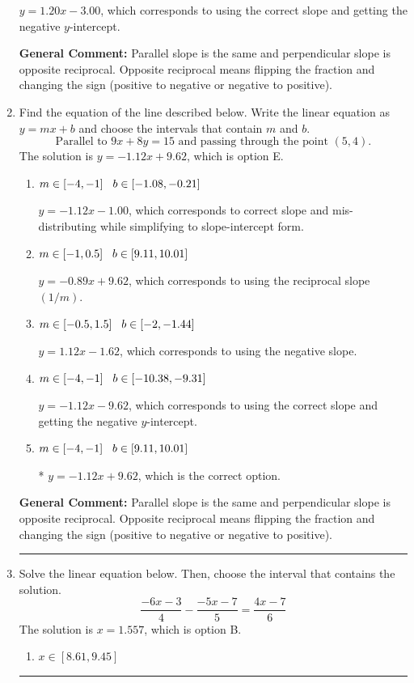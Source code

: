 \documentclass{extbook}[14pt]
\newcommand{\litem}[1]{\item #1

\rule{\textwidth}{0.4pt}}
\begin{document}
\begin{enumerate}
{\begin{enumerate}[label=\Alph*.]
 $y = 1.20x - 3.00$, which corresponds to using the correct slope and getting the negative $y$-intercept.
\end{enumerate}

\textbf{General Comment:} Parallel slope is the same and perpendicular slope is opposite reciprocal. Opposite reciprocal means flipping the fraction and changing the sign (positive to negative or negative to positive).
}
\litem{
Find the equation of the line described below. Write the linear equation as $ y=mx+b $ and choose the intervals that contain $m$ and $b$.
\[ \text{Parallel to } 9 x + 8 y = 15 \text{ and passing through the point } (5, 4). \]
The solution is \( y = -1.12x + 9.62 \), which is option E.\begin{enumerate}[label=\Alph*.]
\item \( m \in [-4, -1] \hspace*{3mm} b \in [-1.08, -0.21] \)

 $y = -1.12x - 1.00$, which corresponds to correct slope and mis-distributing while simplifying to slope-intercept form.
\item \( m \in [-1, 0.5] \hspace*{3mm} b \in [9.11, 10.01] \)

 $y = -0.89x + 9.62$, which corresponds to using the reciprocal slope $(1/m)$.
\item \( m \in [-0.5, 1.5] \hspace*{3mm} b \in [-2, -1.44] \)

 $y = 1.12x - 1.62$, which corresponds to using the negative slope.
\item \( m \in [-4, -1] \hspace*{3mm} b \in [-10.38, -9.31] \)

 $y = -1.12x - 9.62$, which corresponds to using the correct slope and getting the negative $y$-intercept.
\item \( m \in [-4, -1] \hspace*{3mm} b \in [9.11, 10.01] \)

* $y = -1.12x + 9.62$, which is the correct option.
\end{enumerate}

\textbf{General Comment:} Parallel slope is the same and perpendicular slope is opposite reciprocal. Opposite reciprocal means flipping the fraction and changing the sign (positive to negative or negative to positive).
}
\litem{
Solve the linear equation below. Then, choose the interval that contains the solution.
\[ \frac{-6x -3}{4} - \frac{-5x -7}{5} = \frac{4x -7}{6} \]
The solution is \( x = 1.557 \), which is option B.\begin{enumerate}[label=\Alph*.]
\item \( x \in [8.61, 9.45] \)


\end{enumerate}}
\end{enumerate}
\end{document}

